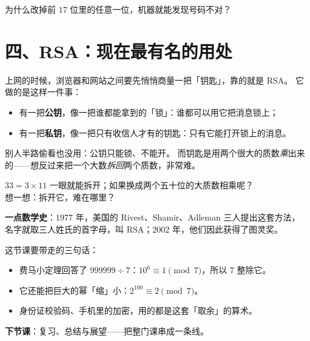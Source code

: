 \begin{sikao}
  为什么改掉前 \(17\) 位里的任意一位，机器就能发现号码不对？
\end{sikao}

\section*{四、RSA：现在最有名的用处}

\noindent 上网的时候，浏览器和网站之间要先悄悄商量一把「钥匙」，靠的就是 RSA。
它做的是这样一件事：

\begin{itemize}
  \item 有一把\textbf{公钥}，像一把谁都能拿到的「锁」：谁都可以用它把消息锁上；
  \item 有一把\textbf{私钥}，像一把只有收信人才有的钥匙：只有它能打开锁上的消息。
\end{itemize}

\noindent 别人半路偷看也没用：公钥只能锁、不能开。
而钥匙是用两个很大的质数\emph{乘}出来的——想反过来把一个大数\emph{拆回}两个质数，非常难。

\begin{sikao}
  \(33=3\times11\) 一眼就能拆开；如果换成两个五十位的大质数相乘呢？\\
  想一想：拆开它，难在哪里？
\end{sikao}

\noindent\textbf{一点数学史}：\(1977\) 年，美国的 Rivest、Shamir、Adleman 三人提出这套方法，
名字就取三人姓氏的首字母，叫 RSA；\(2002\) 年，他们因此获得了图灵奖。

\begin{xiaojie}
  这节课要带走的三句话：
  \begin{itemize}
    \item 费马小定理回答了 \(999999\div7\)：\(10^{6}\equiv1\pmod 7\)，所以 \(7\) 整除它。
    \item 它还能把巨大的幂「缩」小：\(2^{100}\equiv2\pmod 7\)。
    \item 身份证校验码、手机里的加密，用的都是这套「取余」的算术。
  \end{itemize}
\end{xiaojie}

\noindent\textbf{下节课}：复习、总结与展望——把整门课串成一条线。